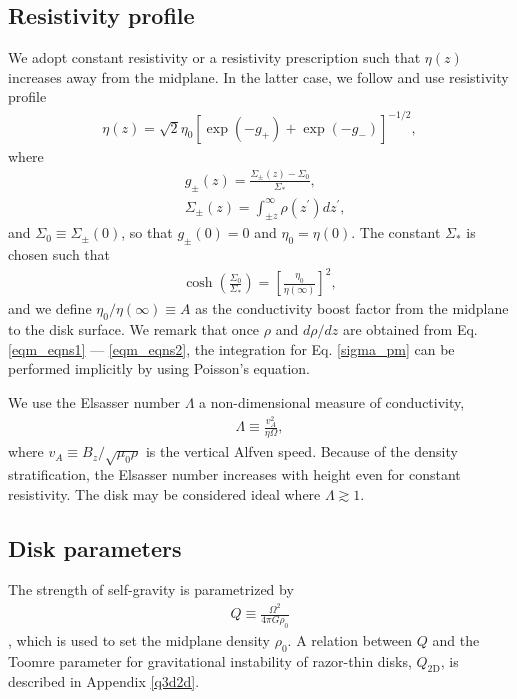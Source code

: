 \subsection{Resistivity profile}\label{resis_profile}
We adopt constant resistivity or a 
resistivity prescription such that $\eta(z)$ increases away from the
midplane. In the latter case, we follow \cite{fleming03} and use 
resistivity profile 
\begin{align}
  \eta(z) =
  \sqrt{2}\eta_0\left[\exp{\left(-g_+\right)}+\exp{\left(-g_-\right)}\right]^{-1/2},  
\end{align}
where
\begin{align}
  &g_\pm(z) =  \frac{\Sigma_\pm(z)-\Sigma_0}{\Sigma_*}, \\
  &\Sigma_\pm(z) = \int_{\pm z}^\infty\rho(z^\prime)dz^\prime, \label{sigma_pm}
\end{align}
and $\Sigma_0\equiv\Sigma_{\pm}(0)$, so that $g_\pm(0)=0$ and $\eta_0 
= \eta(0)$. The constant $\Sigma_*$ is chosen such that 
\begin{align}
  \cosh{\left(\frac{\Sigma_0}{\Sigma_*}\right)} =
  \left[\frac{\eta_0}{\eta(\infty)}\right]^2,
\end{align}
and we define $\eta_0/\eta(\infty)\equiv A$ as the conductivity 
boost factor from the midplane to the disk surface. We remark that
once $\rho$ and $d\rho/dz$ are obtained from
Eq. \ref{eqm_eqns1} --- \ref{eqm_eqns2}, the integration for
Eq. \ref{sigma_pm} can be performed implicitly by using Poisson's 
equation. 

We use the Elsasser number $\Lambda$ a non-dimensional measure of
conductivity,
\begin{align} 
  \Lambda \equiv \frac{v_A^2}{\eta\Omega},
\end{align}
where $v_A \equiv B_z/\sqrt{\mu_0\rho}$ is the vertical Alfven speed. 
Because of the density stratification, the Elsasser number 
increases with height even for constant resistivity. The disk may be
considered ideal where $\Lambda \gtrsim 1$. 


\subsection{Disk parameters}
The strength of self-gravity is
parametrized by 
\begin{align}
  Q \equiv \frac{\Omega^2}{4\pi G\rho_0}
\end{align}
\citep{mamat10}, which is used to set the midplane density $\rho_0$. 
A relation between $Q$ and the Toomre parameter for gravitational
instability of razor-thin disks, $Q_\mathrm{2D}$, is described in
Appendix \ref{q3d2d}.  

